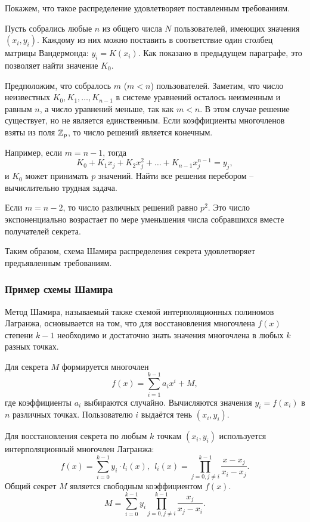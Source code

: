 Покажем, что такое распределение удовлетворяет поставленным требованиям.

Пусть собрались любые $n$ из общего числа $N$ пользователей, имеющих значения $(x_i, y_i)$. Каждому из них можно поставить в соответствие один столбец матрицы Вандермонда: $y_i = K(x_i)$. Как показано в предыдущем параграфе, это позволяет найти значение $K_0$.

Предположим, что собралось $m$ ($m<n$) пользователей. Заметим, что число неизвестных $K_0, K_1, \dots, K_{n-1}$ в системе уравнений осталось неизменным и равным $n$, а число уравнений меньше, так как $m<n$. В этом случае решение существует, но не является единственным. Если коэффициенты многочленов взяты из поля $\mathbb{Z}_p$, то число решений является конечным.

Например, если $m = n - 1$, тогда
    \[ K_0 + K_1 x_j + K_2 x_j^2 + \dots + K_{n-1} x_j^{n-1} = y_j, \]
и $K_0$ может принимать $p$ значений. Найти все решения перебором -- вычислительно трудная задача.

Если $m = n - 2$, то число различных решений равно $p^2$. Это число экспоненциально возрастает по мере уменьшения числа собравшихся вместе получателей секрета.

Таким образом, схема Шамира распределения секрета удовлетворяет предъявленным требованиям.

\subsubsection{Пример схемы Шамира}

Метод Шамира, называемый также схемой интерполяционных полиномов Лагранжа, основывается на том, что для восстановления многочлена $f(x)$ степени $k-1$ необходимо и достаточно знать значения многочлена в любых $k$ разных точках.

Для секрета $M$ формируется многочлен
    \[ f(x) = \sum\limits_{i=1}^{k-1} a_i x^i + M, \]
где коэффициенты $a_i$ выбираются случайно. Вычисляются значения $y_i = f(x_i)$ в $n$ различных точках. Пользователю $i$ выдаётся тень $(x_i, y_i)$.

Для восстановления секрета по любым $k$ точкам $(x_i, y_i)$ используется интерполяционный многочлен Лагранжа:
    \[ f(x) = \sum\limits_{i=0}^{k-1} y_i \cdot l_i(x), ~~ l_i(x) = \prod\limits_{j=0, j \neq i}^{k-1} \frac{x - x_j}{x_i - x_j}. \]
Общий секрет $M$ является свободным коэффициентом $f(x)$.
    \[ M = \sum\limits_{i=0}^{k-1} y_i \prod\limits_{j=0, j \neq i}^{k-1} \frac{x_j}{x_j - x_i}. \]

